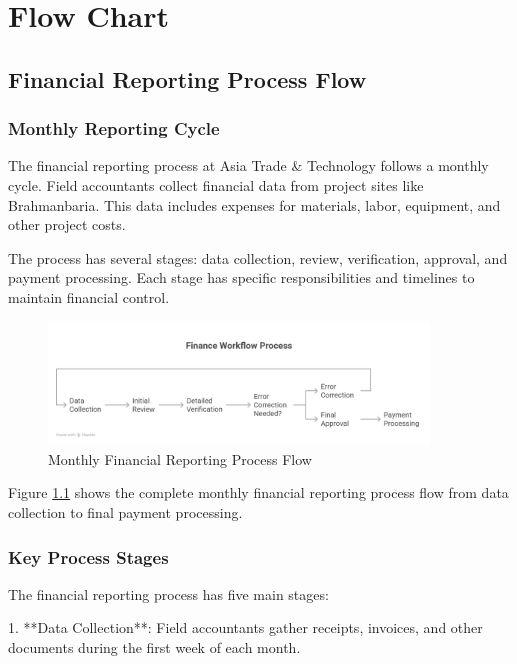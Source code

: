 
\chapter{Flow Chart}

\section{Financial Reporting Process Flow}

\subsection{Monthly Reporting Cycle}
The financial reporting process at Asia Trade \& Technology follows a monthly cycle. Field accountants collect financial data from project sites like Brahmanbaria. This data includes expenses for materials, labor, equipment, and other project costs.

The process has several stages: data collection, review, verification, approval, and payment processing. Each stage has specific responsibilities and timelines to maintain financial control.

\begin{figure}[H]
    \centering
    \includegraphics[width=0.9\textwidth]{assets/images/financial_flowchart.png}
    \caption{Monthly Financial Reporting Process Flow}
    \label{fig:financial_flowchart}
\end{figure}

Figure \ref{fig:financial_flowchart} shows the complete monthly financial reporting process flow from data collection to final payment processing.

\subsection{Key Process Stages}
The financial reporting process has five main stages:

1. **Data Collection**: Field accountants gather receipts, invoices, and other documents during the first week of each month.

